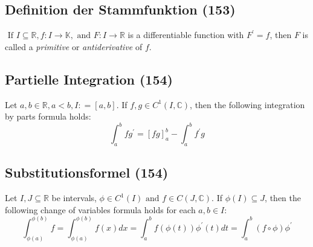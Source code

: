 
\subsection{Definition der Stammfunktion (153)}

$\text{ If } I \subseteq \mathbb { R } ,f : I \rightarrow \mathbb { K } ,\text{ and } F : I \rightarrow \mathbb { R }$ is a differentiable function with $F ^ { \prime } = f$, then $F$ is called a \textit{primitive} or \textit{antiderivative }of $f$.


\subsection{Partielle Integration (154)}

Let $a ,b \in \mathbb { R } ,a < b ,I : = [ a ,b ]$. If $f ,g \in C ^ { 1} ( I ,\mathbb { C } )$, then the following integration by parts formula holds:
\begin{equation}
\int _ { a } ^ { b } f g ^ { \prime } = [ f g ] _ { a } ^ { b } - \int _ { a } ^ { b } f ^ { \prime } g
\end{equation}


\subsection{Substitutionsformel (154)}
Let $I ,J \subseteq \mathbb { R }$ be intervals, $\phi \in C ^ { 1} ( I ) \text{ and } f \in C ( J ,\mathbb { C } )$. If $\phi ( I ) \subseteq J$, then the following change of variables formula holds for each $a ,b \in I$:
\begin{equation}
\int _ { \phi ( a ) } ^ { \phi ( b ) } f = \int _ { \phi ( a ) } ^ { \phi ( b ) } f ( x ) d x = \int _ { a } ^ { b } f ( \phi ( t ) ) \phi ^ { \prime } ( t ) d t = \int _ { a } ^ { b } ( f \circ \phi ) \phi ^ { \prime }
\end{equation}

